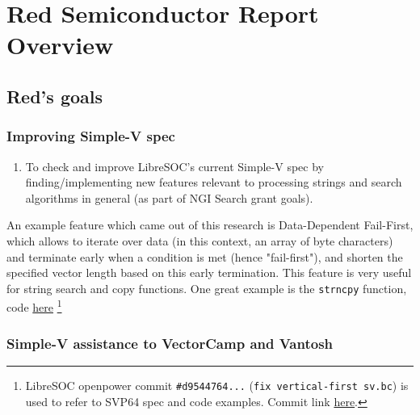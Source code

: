 \section{Red Semiconductor Report Overview}

\subsection{Red's goals}

\subsubsection{Improving Simple-V spec}

\begin{enumerate}
  \item To check and improve LibreSOC's current Simple-V spec by finding/implementing
  new features relevant to processing strings and search algorithms in general
  (as part of NGI Search grant goals).
\end{enumerate}

An example feature which came out of this research is
Data-Dependent Fail-First, which allows to iterate over data (in
this context, an array of byte characters) and terminate early when
a condition is met (hence "fail-first"), and shorten the specified
vector length based on this early termination. This feature is very useful
for string search and copy functions. One great example is the \texttt{strncpy}
function, code \href{https://git.libre-soc.org/?p=openpower-isa.git;a=blob;f=src/openpower/decoder/isa/test_caller_svp64_ldst.py;h=4ecf534777a5e8a0178b29dbcd69a1a5e2dd14d6;hb=d9544764b1710f3807a9c0685d150a665f70b9a2#l31}{here}
\footnote{LibreSOC openpower commit \texttt{\#d9544764...}
(\texttt{fix vertical-first sv.bc}) is used to refer to
SVP64 spec and code examples. Commit link
\href{https://git.libre-soc.org/?p=openpower-isa.git;a=commit;h=d9544764b1710f3807a9c0685d150a665f70b9a2}{here}.}

\subsubsection{Simple-V assistance to VectorCamp and Vantosh}


